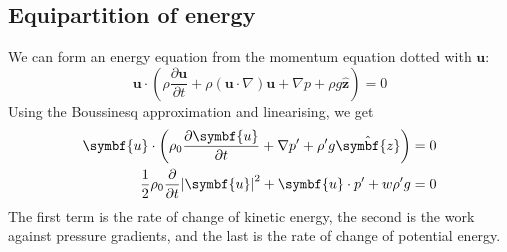 \documentclass{jknotes}
\begin{document}
\subsection{Equipartition of energy}
We can form an energy equation from the momentum equation dotted with
$\symbf{u}$:
\begin{equation}
	\symbf{u} \cdot \left( \rho \frac{\partial \symbf{u}}{\partial t} + \rho
	(\symbf{u}\cdot\nabla)\symbf{u} + \nabla p + \rho g \hat{\symbf{z}}\right)
	= 0
\end{equation}
Using the Boussinesq approximation and linearising, we get
\begin{align}
	\symbf{u} \cdot \left( \rho_0 \frac{\partial \symbf{u}}{\partial t} +
	\nabla p' + \rho' g \hat{\symbf{z}}\right) &= 0 \\
	\frac{1}{2}\rho_0 \frac{\partial}{\partial t} \abs{\symbf{u}}^2 +
	\symbf{u} \cdot p' + w \rho' g &= 0
\end{align}
The first term is the rate of change of kinetic energy, the second is the work
against pressure gradients, and the last is the rate of change of potential
energy.
\end{document}
